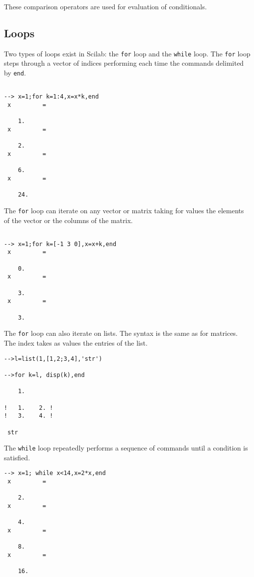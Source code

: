 These comparison operators are used for evaluation of conditionals.

\subsection{Loops}
Two types of loops exist in Scilab: the 
{\tt for} loop
and the 
{\tt while} loop.  The {\tt for} loop
steps through a vector of indices performing each time the
commands delimited by {\tt end}.  
\begin{verbatim}
 
--> x=1;for k=1:4,x=x*k,end
 x         =
 
    1.  
 x         =
 
    2.  
 x         =
 
    6.  
 x         =
 
    24.  
\end{verbatim}
The {\tt for} loop can iterate on any vector or matrix taking for values
the elements of the vector or the columns of the matrix.
\begin{verbatim}
 
--> x=1;for k=[-1 3 0],x=x+k,end
 x         =
 
    0.  
 x         =
 
    3.  
 x         =
 
    3.  
\end{verbatim}
The {\tt for} loop can also iterate on lists. The syntax is the same as for
matrices. The index takes as values the entries of the list.

\begin{verbatim}
-->l=list(1,[1,2;3,4],'str')

-->for k=l, disp(k),end
 
    1.  
 
!   1.    2. !
!   3.    4. !
 
 str
\end{verbatim}

	The {\tt while} loop repeatedly performs a sequence of commands 
until a condition is satisfied.
\begin{verbatim}
--> x=1; while x<14,x=2*x,end
 x         =
 
    2.  
 x         =
 
    4.  
 x         =
 
    8.  
 x         =
 
    16.  

\end{verbatim}


